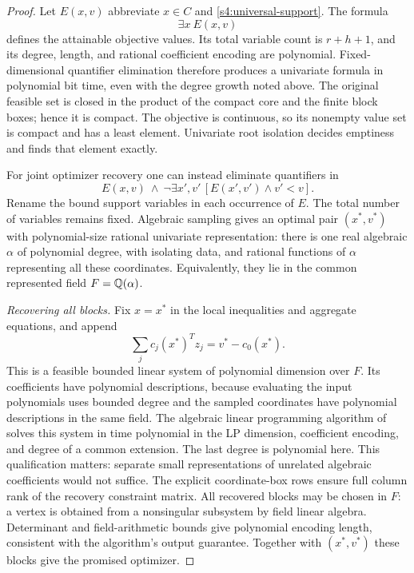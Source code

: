 \begin{proof}
Let $E(x,v)$ abbreviate $x\in C$ and
\eqref{s4:universal-support}. The formula
\[
 \exists x\ E(x,v)
\]
defines the attainable objective values. Its total variable count is
$r+h+1$, and its degree, length, and rational coefficient encoding
are polynomial. Fixed-dimensional quantifier elimination therefore
produces a univariate formula in polynomial bit time, even with the
degree growth noted above. The original feasible set is closed in the
product of the compact core and the finite block boxes; hence it is
compact. The objective is continuous, so its nonempty value set is
compact and has a least element. Univariate root isolation decides
emptiness and finds that element exactly.

For joint optimizer recovery one can instead eliminate quantifiers in
\begin{equation}
 E(x,v)\ \wedge\
 \neg\exists x',v'\,[E(x',v')\wedge v'<v].
 \label{s4:optimal-sample}
\end{equation}
Rename the bound support variables in each occurrence of $E$.
The total number of variables remains fixed. Algebraic sampling gives
an optimal pair $(x^*,v^*)$ with polynomial-size rational univariate
representation: there is one real algebraic $\alpha$ of polynomial
degree, with isolating data, and rational functions of $\alpha$
representing all these coordinates. Equivalently, they lie in the
common represented field $F=\mathbb Q(\alpha)$.

\emph{Recovering all blocks.}
Fix $x=x^*$ in the local inequalities and aggregate equations, and
append
\[
 \sum_jc_j(x^*)^Tz_j=v^*-c_0(x^*).
\]
This is a feasible bounded linear system of polynomial dimension over
$F$. Its coefficients have polynomial descriptions, because evaluating
the input polynomials uses bounded degree and the sampled coordinates
have polynomial descriptions in the same field. The algebraic linear
programming algorithm of \citet[Section~5, Remark~1]{s4:adler1994}
solves this system in time polynomial in the LP dimension, coefficient
encoding, and degree of a common extension. The last degree is
polynomial here. This qualification matters: separate small
representations of unrelated algebraic coefficients would not suffice.
The explicit coordinate-box rows ensure full column rank of the
recovery constraint matrix. All recovered blocks may be chosen in $F$: a vertex is obtained from
a nonsingular subsystem by field linear algebra. Determinant and
field-arithmetic bounds give polynomial encoding length, consistent
with the algorithm's output guarantee. Together with $(x^*,v^*)$ these
blocks give the promised optimizer.


\end{proof}
